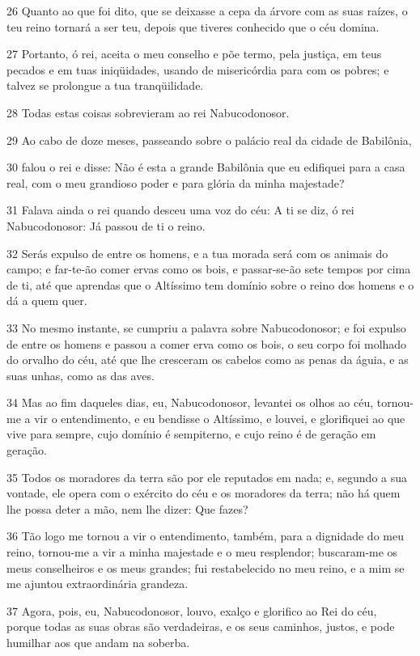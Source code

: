 \par 26 Quanto ao que foi dito, que se deixasse a cepa da árvore com as suas raízes, o teu reino tornará a ser teu, depois que tiveres conhecido que o céu domina.
\par 27 Portanto, ó rei, aceita o meu conselho e põe termo, pela justiça, em teus pecados e em tuas iniqüidades, usando de misericórdia para com os pobres; e talvez se prolongue a tua tranqüilidade.
\par 28 Todas estas coisas sobrevieram ao rei Nabucodonosor.
\par 29 Ao cabo de doze meses, passeando sobre o palácio real da cidade de Babilônia,
\par 30 falou o rei e disse: Não é esta a grande Babilônia que eu edifiquei para a casa real, com o meu grandioso poder e para glória da minha majestade?
\par 31 Falava ainda o rei quando desceu uma voz do céu: A ti se diz, ó rei Nabucodonosor: Já passou de ti o reino.
\par 32 Serás expulso de entre os homens, e a tua morada será com os animais do campo; e far-te-ão comer ervas como os bois, e passar-se-ão sete tempos por cima de ti, até que aprendas que o Altíssimo tem domínio sobre o reino dos homens e o dá a quem quer.
\par 33 No mesmo instante, se cumpriu a palavra sobre Nabucodonosor; e foi expulso de entre os homens e passou a comer erva como os bois, o seu corpo foi molhado do orvalho do céu, até que lhe cresceram os cabelos como as penas da águia, e as suas unhas, como as das aves.
\par 34 Mas ao fim daqueles dias, eu, Nabucodonosor, levantei os olhos ao céu, tornou-me a vir o entendimento, e eu bendisse o Altíssimo, e louvei, e glorifiquei ao que vive para sempre, cujo domínio é sempiterno, e cujo reino é de geração em geração.
\par 35 Todos os moradores da terra são por ele reputados em nada; e, segundo a sua vontade, ele opera com o exército do céu e os moradores da terra; não há quem lhe possa deter a mão, nem lhe dizer: Que fazes?
\par 36 Tão logo me tornou a vir o entendimento, também, para a dignidade do meu reino, tornou-me a vir a minha majestade e o meu resplendor; buscaram-me os meus conselheiros e os meus grandes; fui restabelecido no meu reino, e a mim se me ajuntou extraordinária grandeza.
\par 37 Agora, pois, eu, Nabucodonosor, louvo, exalço e glorifico ao Rei do céu, porque todas as suas obras são verdadeiras, e os seus caminhos, justos, e pode humilhar aos que andam na soberba.

